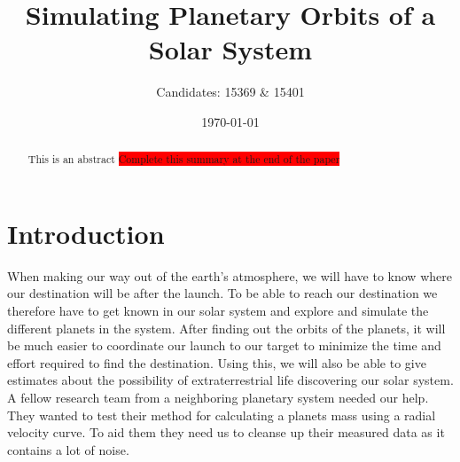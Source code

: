 \documentclass[reprint,english,notitlepage]{revtex4-2}
\begin{document}
\title{Simulating Planetary Orbits of a Solar System}
\author{Candidates: 15369 \& 15401}
\date{\today}

\begin{abstract}
This is an abstract \colorbox{red}{Complete this summary at the end of the paper}
\end{abstract}
\maketitle

\section{Introduction}
When making our way out of the earth's atmosphere, we will have to know where our destination will be after the launch.
To be able to reach our destination we therefore have to get known in our solar system and explore and simulate the different planets in the system.
After finding out the orbits of the planets, it will be much easier to coordinate our launch to our target to minimize the time and effort required to find the destination.
Using this, we will also be able to give estimates about the possibility of extraterrestrial life discovering our solar system. A fellow research team from a neighboring planetary system needed our help. They wanted to test their method for calculating a planets mass using a radial velocity curve. To aid them they need us to cleanse up their measured data as it contains a lot of noise. 
\end{document}
